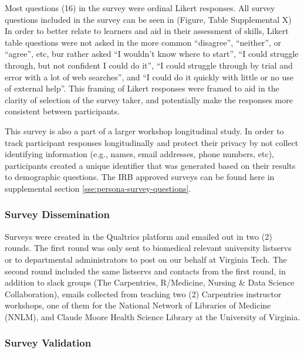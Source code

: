 \documentclass[020-persona\_validation.tex]{subfiles}
\begin{document}
            Most questions (16) in the survey were ordinal Likert responses.
            All survey questions included in the survey can be seen in
            (Figure, Table Supplemental X)
            In order to better relate to learners and aid in their assessment of skills,
            Likert table questions were not asked in the more common
            ``disagree'', ``neither'', or ``agree'', etc,
            bur rather asked
            ``I wouldn't know where to start'',
            ``I could struggle through, but not confident I could do it'',
            ``I could struggle through by trial and error with a lot of web searches'',
            and
            ``I could do it quickly with little or no use of external help''.
            This framing of Likert responses were framed to aid in the clarity of selection of the survey taker,
            and potentially make the responses more consistent between participants.
    
            This survey is also a part of a larger workshop longitudinal study.
            In order to track participant responses longitudinally and protect their privacy by not collect identifying information
            (e.g., names, email addresses, phone numbers, etc),
            participants created a unique identifier that was generated based on their results to demographic questions.
            The IRB approved surveys can be found here in supplemental section \ref{sse:persona-survey-questions}.
        
        \subsubsection{Survey Dissemination}

            Surveys were created in the Qualtrics platform and emailed out in two (2) rounds.
            The first round was only sent to biomedical relevant university listservs
            or to departmental administrators to post on our behalf at Virginia Tech.
            The second round included the same listservs and contacts from the first round,
            in addition to slack groups (The Carpentries, R/Medicine, Nursing \& Data Science Collaboration),
            emails collected from teaching two (2) Carpentries instructor workshops,
            one of them for the National Network of Libraries of Medicine (NNLM),
            and
            Claude Moore Health Science Library at the University of Virginia.

        \subsubsection{Survey Validation}
    
\end{document}
